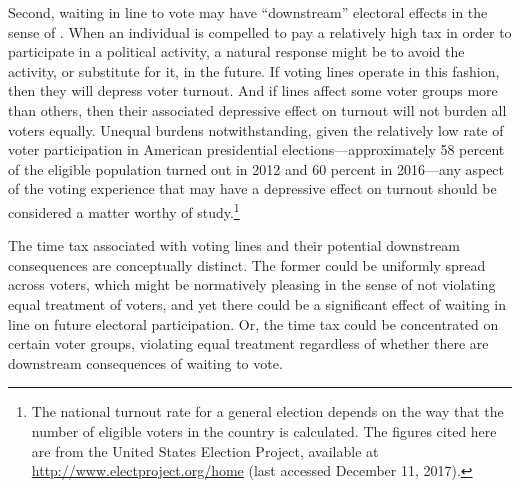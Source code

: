 \documentclass[12pt,titlepage]{article}
\begin{document}
Second, waiting in line to vote may have ``downstream'' electoral
effects in the sense of
\citet{pettigrew:longlinesminorityprecincts}. When an individual is
compelled to pay a relatively high tax in order to participate in a
political activity, a natural response might be to avoid the activity,
or substitute for it, in the future. If voting lines operate in this
fashion, then they will depress voter turnout. And if lines affect
some voter groups more than others, then their associated depressive
effect on turnout will not burden all voters equally. Unequal burdens
notwithstanding, given the relatively low rate of voter participation
in American presidential elections---approximately 58 percent of the
eligible population turned out in 2012 and 60 percent in 2016---any
aspect of the voting experience that may have a depressive effect on
turnout should be considered a matter worthy of study.\footnote{The
  national turnout rate for a general election
  depends on the way that the number of eligible voters in the country
  is calculated.  The figures cited here are from the United States
  Election Project, available at
  \url{http://www.electproject.org/home} (last accessed December 11,
  2017).\label{fn:uselectionproject}}



The time tax associated with voting lines and their potential
downstream consequences are conceptually distinct. The former could be
uniformly spread across voters, which might be normatively pleasing in
the sense of not violating equal treatment of voters, and yet there
could be a significant effect of waiting in line on future electoral
participation. Or, the time tax could be concentrated on certain voter
groups, violating equal treatment regardless of whether there are
downstream consequences of waiting to vote.
\end{document}
